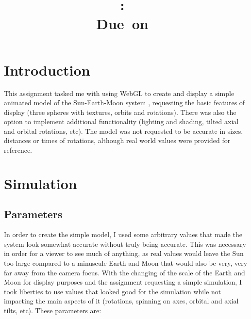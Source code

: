 \documentclass[12pt]{article}
\title{
\vspace{2in}
\textmd{\textbf{\hmwkClass:\ \hmwkTitle}}\\
\normalsize\vspace{0.1in}\small{Due\ on\ \hmwkDueDate}\\
\vspace{3in}
}
\author{\textbf{\hmwkAuthorName}}
\date{} %
\begin{document}
\maketitle



\newpage
\tableofcontents
\newpage



\section{Introduction}
This assignment tasked me with using WebGL to create and display a simple animated model of the Sun-Earth-Moon system \cite{assignment}, requesting the basic features of display (three spheres with textures, orbits and rotations). There was also the option to implement additional functionality (lighting and shading, tilted axial and orbital rotations, etc). The model was not requested to be accurate in sizes, distances or times of rotations, although real world values were provided for reference.

\section{Simulation}
\subsection{Parameters}
In order to create the simple model, I used some arbitrary values that made the system look somewhat accurate without truly being accurate. This was necessary in order for a viewer to see much of anything, as real values would leave the Sun too large compared to a minuscule Earth and Moon that would also be very, very far away from the camera focus. With the changing of the scale of the Earth and Moon for display purposes and the assignment requesting a simple simulation, I took liberties to use values that looked good for the simulation while not impacting the main aspects of it (rotations, spinning on axes, orbital and axial tilts, etc). These parameters are:
\end{document}
